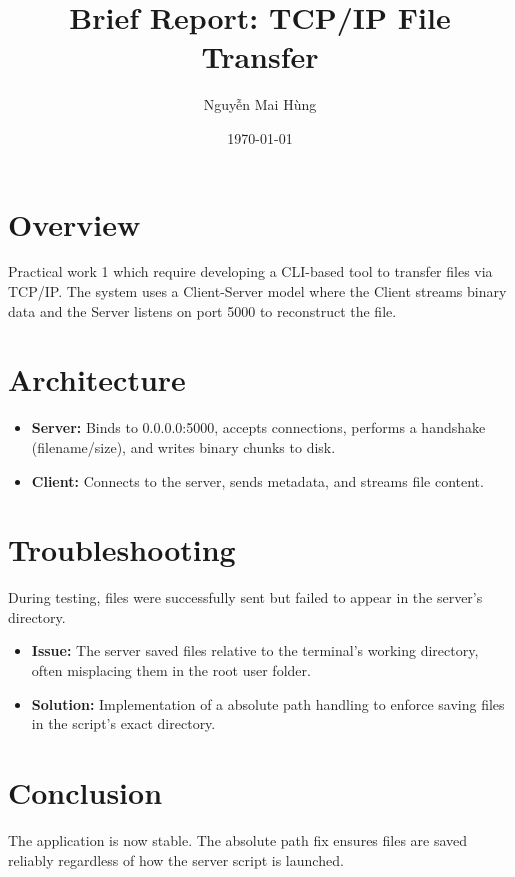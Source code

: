 \documentclass[a4paper, 11pt]{article}
\title{\textbf{Brief Report: TCP/IP File Transfer}}
\author{Nguyễn Mai Hùng}
\date{\today}
\begin{document}
\maketitle

\section{Overview}
Practical work 1 which require developing a CLI-based tool to transfer files via TCP/IP. The system uses a Client-Server model where the Client streams binary data and the Server listens on port 5000 to reconstruct the file.

\section{Architecture}
\begin{itemize}
    \item \textbf{Server:} Binds to 0.0.0.0:5000, accepts connections, performs a handshake (filename/size), and writes binary chunks to disk.
    \item \textbf{Client:} Connects to the server, sends metadata, and streams file content.
\end{itemize}

\section{Troubleshooting}
During testing, files were successfully sent but failed to appear in the server's directory.
\begin{itemize}
    \item \textbf{Issue:} The server saved files relative to the terminal's working directory, often misplacing them in the root user folder.
    \item \textbf{Solution:} Implementation of a absolute path handling to enforce saving files in the script's exact directory.
\end{itemize}

\section{Conclusion}
The application is now stable. The absolute path fix ensures files are saved reliably regardless of how the server script is launched.
\end{document}
